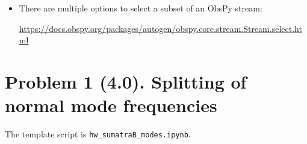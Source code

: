 \documentclass[11pt,titlepage,fleqn]{article}
\newcommand{\tfilemodes}{{\tt hw\_sumatraB\_modes.ipynb}}
\begin{document}
\begin{spacing}{1.0}
\begin{itemize}
\begin{itemize}
\end{itemize}


\item There are multiple options to select a subset of an ObsPy stream:

\url{https://docs.obspy.org/packages/autogen/obspy.core.stream.Stream.select.html}

%

%
%

\end{itemize}

\end{spacing}





\pagebreak
\section*{Problem 1 (4.0). Splitting of normal mode frequencies}

The template script is \tfilemodes.
\end{document}
